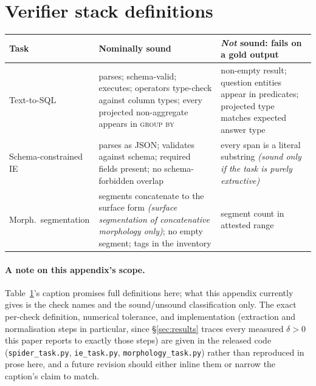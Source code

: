 \documentclass[11pt]{article}
\begin{document}
\section{Verifier stack definitions}\label{app:checks}
\begin{table}[t]\centering\small
\setlength{\tabcolsep}{3pt}
\begin{tabular}{@{}p{1.55cm}p{3.05cm}p{2.15cm}@{}}
\toprule
Task & Nominally sound & \emph{Not} sound: fails on a gold output \\
\midrule
Text-to-SQL & parses; schema-valid; executes; operators type-check against column types; every projected non-aggregate appears in \textsc{group by} & non-empty result; question entities appear in predicates; projected type matches expected answer type \\[2pt]
Schema-con\-strained IE & parses as JSON; validates against schema; required fields present; no schema-forbidden overlap & every span is a literal substring \emph{(sound only if the task is purely extractive)} \\[2pt]
Morph.\ segmentation & segments concatenate to the surface form \emph{(surface segmentation of concatenative morphology only)}; no empty segment; tags in the inventory & segment count in attested range \\
\bottomrule
\end{tabular}
\label{tab:stacks}
\end{table}

\paragraph{A note on this appendix's scope.} Table~\ref{tab:stacks}'s caption promises full definitions here; what this appendix currently gives is the check names and the sound/unsound classification only. The exact per-check definition, numerical tolerance, and implementation (extraction and normalisation steps in particular, since \S\ref{sec:results} traces every measured $\delta>0$ this paper reports to exactly those steps) are given in the released code (\texttt{spider\_task.py}, \texttt{ie\_task.py}, \texttt{morphology\_task.py}) rather than reproduced in prose here, and a future revision should either inline them or narrow the caption's claim to match.
\end{document}
